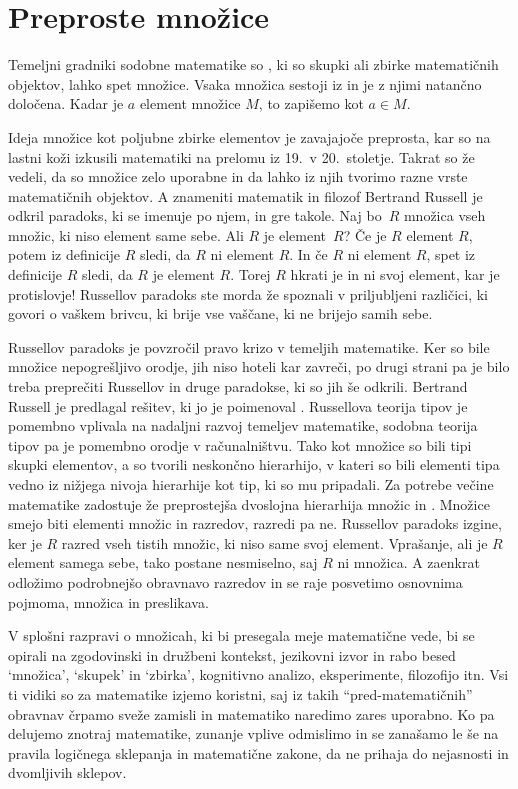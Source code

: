 \chapter{Preproste množice}
\label{cha:preproste-mnozice}


Temeljni gradniki sodobne matematike so , ki so skupki ali zbirke matematičnih
objektov, lahko spet množice. Vsaka množica sestoji iz  in je z njimi
natančno določena. Kadar je $a$ element množice $M$, to zapišemo kot $a \in M$.

Ideja množice kot poljubne zbirke elementov je zavajajoče preprosta, kar so na lastni koži
izkusili matematiki na prelomu iz 19.~v 20.~stoletje. Takrat so že vedeli, da so množice zelo
uporabne in da lahko iz njih tvorimo razne vrste matematičnih objektov. A znameniti
matematik in filozof Bertrand Russell je odkril paradoks, ki se imenuje po njem, in gre
takole. Naj bo~$R$ množica vseh množic, ki niso element same sebe. Ali $R$ je element~$R$?
Če je $R$ element $R$, potem iz definicije $R$ sledi, da $R$ ni element $R$. In če $R$ ni
element $R$, spet iz definicije $R$ sledi, da $R$ je element $R$. Torej $R$ hkrati je in
ni svoj element, kar je protislovje! Russellov paradoks ste morda že spoznali v
priljubljeni različici, ki govori o vaškem brivcu, ki brije vse vaščane, ki ne brijejo
samih sebe.

Russellov paradoks je povzročil pravo krizo v temeljih matematike. Ker so bile množice
nepogrešljivo orodje, jih niso hoteli kar zavreči, po drugi strani pa je bilo treba
preprečiti Russellov in druge paradokse, ki so jih še odkrili. Bertrand Russell je
predlagal rešitev, ki jo je poimenoval . Russellova teorija tipov je
pomembno vplivala na nadaljni razvoj temeljev matematike, sodobna teorija tipov pa je
pomembno orodje v računalništvu. Tako kot množice so bili tipi skupki elementov, a so
tvorili neskončno hierarhijo, v kateri so bili elementi tipa vedno iz nižjega nivoja
hierarhije kot tip, ki so mu pripadali. Za potrebe večine matematike zadostuje že
preprostejša dvoslojna hierarhija množic in . Množice smejo biti elementi
množic in razredov, razredi pa ne. Russellov paradoks izgine, ker je $R$ razred vseh
tistih množic, ki niso same svoj element. Vprašanje, ali je $R$ element samega sebe, tako
postane nesmiselno, saj $R$ ni množica. A zaenkrat odložimo podrobnejšo obravnavo razredov
in se raje posvetimo osnovnima pojmoma, množica in preslikava.

V splošni razpravi o množicah, ki bi presegala meje matematične vede, bi se opirali na
zgodovinski in družbeni kontekst, jezikovni izvor in rabo besed `množica', `skupek' in
`zbirka', kognitivno analizo, eksperimente, filozofijo itn. Vsi ti vidiki so za matematike
izjemo koristni, saj iz takih ``pred-matematičnih'' obravnav črpamo sveže zamisli in
matematiko naredimo zares uporabno. Ko pa delujemo znotraj matematike, zunanje vplive
odmislimo in se zanašamo le še na pravila logičnega sklepanja in matematične zakone, da ne
prihaja do nejasnosti in dvomljivih sklepov.

